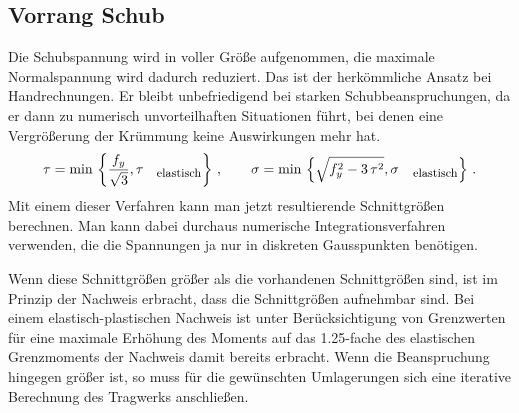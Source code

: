 {\textcolor{sectionTitleBlue}{\subsection{Vorrang Schub}}}
Die Schubspannung wird in voller Gr\"{o}{\ss}e aufgenommen, die maximale Normalspannung wird dadurch reduziert. Das ist der herk\"{o}mmliche Ansatz bei Handrechnungen. Er bleibt unbefriedigend bei starken Schubbeanspruchungen, da er dann zu numerisch unvorteilhaften Situationen f\"{u}hrt, bei denen eine Vergr\"{o}{\ss}erung der Kr\"{u}mmung keine Auswirkungen mehr hat.
\begin{align}
\tau = \mbox{min}\,\left\{\frac{f_y}{\sqrt{3}}, \tau_{\,\mbox{\small elastisch}}
\right\}\,, \qquad \sigma = \mbox{min}\,\left\{\sqrt{f_y^2 - 3\,\tau^2},
\sigma_{\,\mbox{\small elastisch}} \right\}\,.
\end{align}
Mit einem dieser Verfahren kann man jetzt resultierende Schnittgr\"{o}{\ss}en berechnen. Man kann dabei durchaus numerische Integrationsverfahren verwenden, die die Spannungen ja nur in diskreten Gausspunkten ben\"{o}tigen.

Wenn diese Schnittgr\"{o}{\ss}en gr\"{o}{\ss}er als die vorhandenen Schnittgr\"{o}{\ss}en sind, ist im Prinzip der Nachweis erbracht, dass die Schnittgr\"{o}{\ss}en aufnehmbar sind. Bei einem elastisch-plastischen Nachweis ist unter Ber\"{u}cksichtigung von Grenzwerten f\"{u}r eine maximale Erh\"{o}hung des Moments auf das 1.25-fache des elastischen Grenzmoments der Nachweis damit bereits erbracht. Wenn die Beanspruchung hingegen gr\"{o}{\ss}er ist, so muss f\"{u}r die gew\"{u}nschten Umlagerungen sich eine iterative Berechnung des Tragwerks anschlie{\ss}en.

